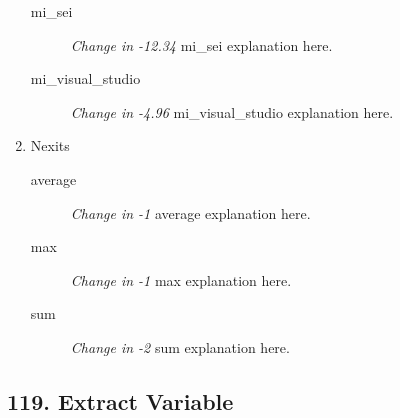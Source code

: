 \begin{enumerate}
\begin{description}
                  \item [mi\_sei] \textit{Change in -12.34} mi\_sei explanation here.
                  \item [mi\_visual\_studio] \textit{Change in -4.96} mi\_visual\_studio explanation here.
            \end{description}
      \item Nexits
            \begin{description}
                  \item [average] \textit{Change in -1} average explanation here.
                  \item [max] \textit{Change in -1} max explanation here.
                  \item [sum] \textit{Change in -2} sum explanation here.
            \end{description}
\end{enumerate}
\subsection{ 119.  Extract Variable }

